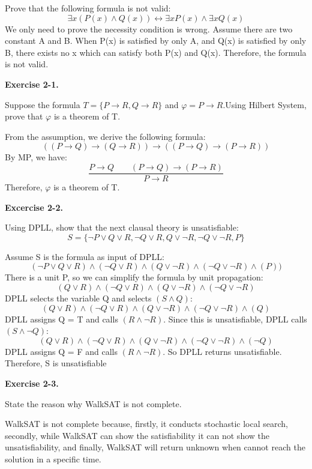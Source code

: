 \documentclass[12pt,twoside]{article}
\begin{document}
\begin{exercises}
Prove that the following formula is not valid:
$$ \exists x (P(x) \wedge Q(x)) \leftrightarrow \exists  x P(x) \wedge \exists x Q(x) $$
\ifsolution \solution{}
We only need to prove the necessity condition is wrong. Assume there are two constant A and B. When P(x) is satisfied by only A, and Q(x) is satisfied by only B, there exists no x which can satisfy both P(x) and Q(x). Therefore, the formula is not valid.

\fi

\textbf{Exercise 2-1.}

Suppose the formula $T = \{P \rightarrow R , Q \rightarrow R\}$ and $\varphi = P \rightarrow R$.Using Hilbert System, prove that $\varphi$ is a theorem of T.

\ifsolution \solution{}
From the assumption, we derive the following formula:
$$((P \rightarrow Q) \rightarrow (Q \rightarrow R)) \rightarrow ((P \rightarrow Q ) \rightarrow (P \rightarrow R))$$
By MP, we have:
$$\frac{P \rightarrow Q \qquad (P \rightarrow Q) \rightarrow (P \rightarrow R) }{P \rightarrow R} $$
Therefore, $\varphi$ is a theorem of T.
\fi

\textbf{Excercise 2-2.}

Using DPLL, show that the next clausal theory is unsatisfiable:
$$S = \{\neg P \vee Q \vee R, \neg Q \vee R, Q \vee \neg R, \neg Q \vee \neg R, P \}$$

\ifsolution \solution{}
Assume S is the formula as input of DPLL:
$$(\neg P \vee Q \vee R) \wedge (\neg Q \vee R) \wedge (Q \vee \neg R) \wedge (\neg Q \vee \neg R) \wedge (P)) $$
There is a unit P, so we can simplify the formula by unit propagation:
$$(Q \vee R) \wedge (\neg Q \vee R) \wedge (Q \vee \neg R) \wedge(\neg Q \vee \neg R) $$
DPLL selects the variable Q and selects $(S \wedge Q)$:
$$(Q \vee R) \wedge (\neg Q \vee R) \wedge (Q \vee \neg R) \wedge(\neg Q \vee \neg R) \wedge (Q) $$
DPLL assigns Q = T and calls $(R \wedge \neg R)$. Since this is unsatisfiable, DPLL calls $(S \wedge \neg Q)$:
$$(Q \vee R) \wedge (\neg Q \vee R) \wedge (Q \vee \neg R) \wedge(\neg Q \vee \neg R) \wedge (\neg Q) $$
DPLL assigns Q = F and calls $(R \wedge \neg R)$. So DPLL returns unsatisfiable. Therefore, S is unsatisfiable
\fi

\textbf{Exercise 2-3.}

State the reason why WalkSAT is not complete.

WalkSAT is not complete because, firstly, it conducts stochastic local search, secondly, while WalkSAT can show the satisfiability it can not show the unsatisfiability, and finally, WalkSAT will return unknown when cannot reach the solution in a specific time.


\end{exercises}
\end{document}

